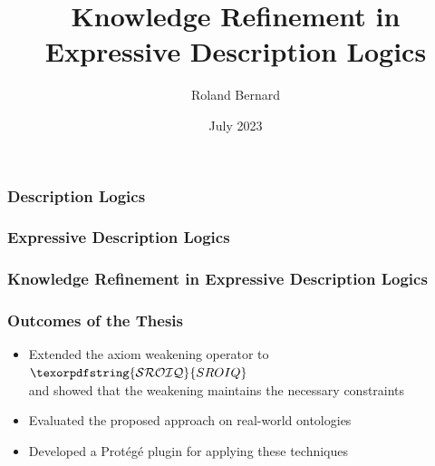 \documentclass[aspectratio=169]{beamer}
\title{Knowledge Refinement in\\Expressive Description Logics}
\author{Roland Bernard}
\date{July 2023}
\newcommand{\SROIQ}{\ensuremath{\texorpdfstring{\mathcal{SROIQ}}{SROIQ}}\xspace}
\begin{document}
\frame{\titlepage}

\begin{frame}
\frametitle{Description Logics}


\end{frame}

\begin{frame}
\frametitle{Expressive \textnormal{Description Logics}}


\end{frame}

\begin{frame}
\frametitle{Knowledge Refinement \textnormal{in Expressive Description Logics}}


\end{frame}

\begin{frame}
\frametitle{Outcomes of the Thesis}
\begin{itemize}
  \item Extended the axiom weakening operator to \SROIQ \\
    {\footnotesize and showed that the weakening maintains the necessary constraints}
  \item Evaluated the proposed approach on real-world ontologies
  \item Developed a Protégé plugin for applying these techniques
\end{itemize}
\end{frame}

{
\begin{frame}[plain]{}
\end{frame}
}
\end{document}
